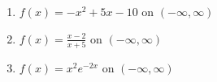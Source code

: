 \documentclass[12pt]{article}
\newif\ifans
\begin{document}
\begin{enumerate}
\ifans{\fbox{no absolute maximum, absolute minimum of $\frac{23}{3}$ when $x=\frac{3}{2}$}} \fi

\item $f(x) = -x^2+5x-10$ on $(-\infty, \infty)$ 

\ifans{\fbox{no absolute minimum, absolute maximum at $-\frac{15}{4}$ when $x=\frac{5}{2}$}} \fi

\item $f(x) = \frac{x-2}{x+5}$ on $(-\infty, \infty)$ 

\ifans{\fbox{none}} \fi

\item $f(x) = x^2e^{-2x}$ on $(-\infty, \infty)$  

\ifans{\fbox{no absolute maximum, absolute minimum of 0 when $x=0$ }} \fi

\end{enumerate}
\end{document}
